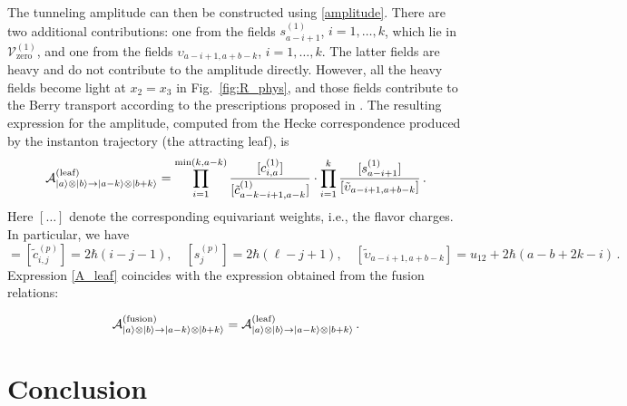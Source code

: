 \documentclass[10pt]{article}
\theoremstyle{definition}
\def\CA{{\cal A}}
\def\sV{{\mathscr{V}}}
\def\lm{\limits}
\numberwithin{equation}{section}
\begin{document}
The tunneling amplitude can then be constructed using \eqref{amplitude}.
There are two additional contributions: one from the fields $s_{a-i+1}^{(1)}$, $i=1,\ldots,k$, which lie in $\sV^{(1)}_{\mathrm{zero}}$, and one from the fields $\upsilon_{a-i+1,a+b-k}$, $i=1,\ldots,k$.
The latter fields are heavy and do not contribute to the amplitude directly.
However, all the heavy fields become light at $x_2=x_3$ in Fig.~\ref{fig:R_phys}, and those fields contribute to the Berry transport according to the prescriptions proposed in \cite[Sec.~5.2]{Galakhov:2025fhd}.
The resulting expression for the amplitude, computed from the Hecke correspondence produced by the instanton trajectory (the attracting leaf), is
\begin{equation}\label{A_leaf}
	\CA^{\rm (leaf)}_{|a\rangle\otimes|b\rangle \to |a-k\rangle\otimes|b+k\rangle}=\prod\lm_{i=1}^{{\rm min}(k,a-k)}\frac{[c_{i,a}^{(1)}]}{[\tilde c_{a-k-i+1,a-k}^{(1)}]}\cdot\prod\lm_{i=1}^k\frac{[s_{a-i+1}^{(1)}]}{[\tilde \upsilon_{a-i+1,a+b-k}]}\,.
\end{equation}
Here $[\ldots]$ denote the corresponding equivariant weights, i.e., the flavor charges.
In particular, we have
\begin{equation}
	[c_{i,j}^{(p)}]=[\tilde c_{i,j}^{(p)}]=2\hbar(i-j-1),\quad [s_{j}^{(p)}]=2\hbar(\ell-j+1),\quad [\tilde \upsilon_{a-i+1,a+b-k}]=u_{12}+2\hbar(a-b+2k-i)\,.
\end{equation}
Expression \eqref{A_leaf} coincides with the expression obtained from the fusion relations:
\begin{tcolorbox}
	\begin{equation}
		\CA^{\rm (fusion)}_{|a\rangle\otimes|b\rangle \to |a-k\rangle\otimes|b+k\rangle}=\CA^{\rm (leaf)}_{|a\rangle\otimes|b\rangle \to |a-k\rangle\otimes|b+k\rangle}\,.
	\end{equation}
\end{tcolorbox}


\section{Conclusion}
\end{document}
